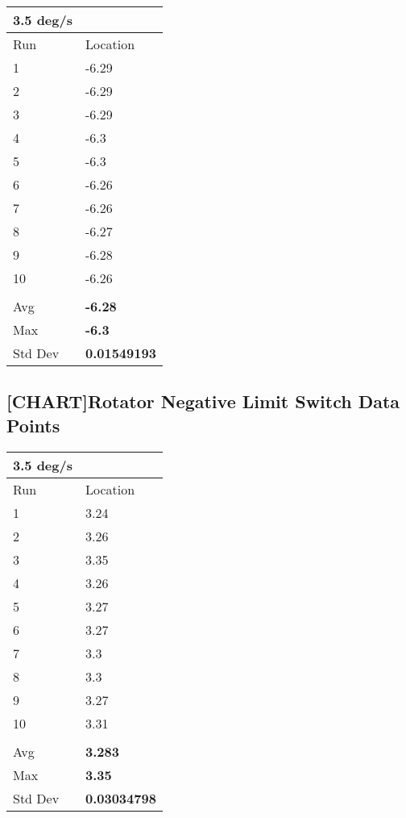 \documentclass[SE,lsstdraft,authoryear,toc]{lsstdoc}
\begin{document}
\begin{longtable}[]{@{}ll@{}}
\toprule
3.5 deg/s & \\
\midrule
\endhead
Run & Location \\
1 & -6.29 \\
2 & -6.29 \\
3 & -6.29 \\
4 & -6.3 \\
5 & -6.3 \\
6 & -6.26 \\
7 & -6.26 \\
8 & -6.27 \\
9 & -6.28 \\
10 & -6.26 \\
& \\
Avg & \textbf{-6.28} \\
Max & \textbf{-6.3} \\
Std Dev & \textbf{0.01549193} \\
\bottomrule
\end{longtable}

\hypertarget{chartrotator-negative-limit-switch-data-points}{%
\subsection{\texorpdfstring{{{[}CHART{]}}Rotator Negative Limit Switch
Data
Points}{{[}CHART{]}Rotator Negative Limit Switch Data Points}}\label{chartrotator-negative-limit-switch-data-points}}

\begin{longtable}[]{@{}ll@{}}
\toprule
3.5 deg/s & \\
\midrule
\endhead
Run & Location \\
1 & 3.24 \\
2 & 3.26 \\
3 & 3.35 \\
4 & 3.26 \\
5 & 3.27 \\
6 & 3.27 \\
7 & 3.3 \\
8 & 3.3 \\
9 & 3.27 \\
10 & 3.31 \\
& \\
Avg & \textbf{3.283} \\
Max & \textbf{3.35} \\
Std Dev & \textbf{0.03034798} \\
\bottomrule
\end{longtable}
\end{document}
